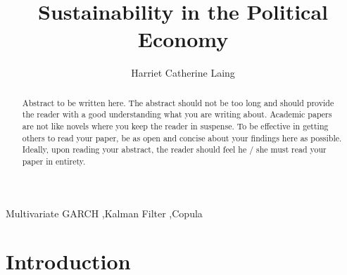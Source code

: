 \documentclass[11pt,preprint, authoryear]{elsarticle}
\numberwithin{equation}{section}
\numberwithin{figure}{section}
\numberwithin{table}{section}
\begin{document}
\begin{frontmatter}  %

\title{Sustainability in the Political Economy}





\author[Add1]{Harriet Catherine Laing}





\address[Add1]{University of Stellenbosch, South Africa}


\begin{abstract}
\small{
Abstract to be written here. The abstract should not be too long and
should provide the reader with a good understanding what you are writing
about. Academic papers are not like novels where you keep the reader in
suspense. To be effective in getting others to read your paper, be as
open and concise about your findings here as possible. Ideally, upon
reading your abstract, the reader should feel he / she must read your
paper in entirety.
}
\end{abstract}

\vspace{1cm}


\begin{keyword}
\footnotesize{
Multivariate GARCH \sep Kalman Filter \sep Copula \\
\vspace{0.3cm}
}
\end{keyword}



\vspace{0.5cm}

\end{frontmatter}



\pagestyle{fancy}
\chead{}
\rhead{}
\lfoot{}
\lhead{}
\cfoot{}


\headsep 35pt %




\hypertarget{introduction}{%
\section{\texorpdfstring{Introduction
\label{Introduction}}{Introduction }}\label{introduction}}
\end{document}
